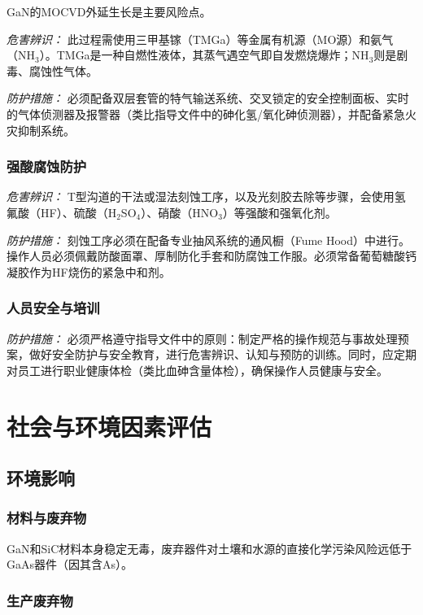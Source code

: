 \documentclass[12pt,a4paper]{article}
\begin{document}
GaN的MOCVD外延生长是主要风险点。

\emph{危害辨识：} 此过程需使用三甲基镓（TMGa）等金属有机源（MO源）和氨气（NH$_3$）。TMGa是一种自燃性液体，其蒸气遇空气即自发燃烧爆炸；NH$_3$则是剧毒、腐蚀性气体。

\emph{防护措施：} 必须配备双层套管的特气输送系统、交叉锁定的安全控制面板、实时的气体侦测器及报警器（类比指导文件中的砷化氢/氧化砷侦测器），并配备紧急火灾抑制系统。

\subsubsection{强酸腐蚀防护}

\emph{危害辨识：} T型沟道的干法或湿法刻蚀工序，以及光刻胶去除等步骤，会使用氢氟酸（HF）、硫酸（H$_2$SO$_4$）、硝酸（HNO$_3$）等强酸和强氧化剂。

\emph{防护措施：} 刻蚀工序必须在配备专业抽风系统的通风橱（Fume Hood）中进行。操作人员必须佩戴防酸面罩、厚制防化手套和防腐蚀工作服。必须常备葡萄糖酸钙凝胶作为HF烧伤的紧急中和剂。

\subsubsection{人员安全与培训}

\emph{防护措施：} 必须严格遵守指导文件中的原则：制定严格的操作规范与事故处理预案，做好安全防护与安全教育，进行危害辨识、认知与预防的训练。同时，应定期对员工进行职业健康体检（类比血砷含量体检），确保操作人员健康与安全。

\clearpage

\section{社会与环境因素评估}

\subsection{环境影响}

\subsubsection{材料与废弃物}

GaN和SiC材料本身稳定无毒，废弃器件对土壤和水源的直接化学污染风险远低于GaAs器件（因其含As）。

\subsubsection{生产废弃物}
\end{document}
